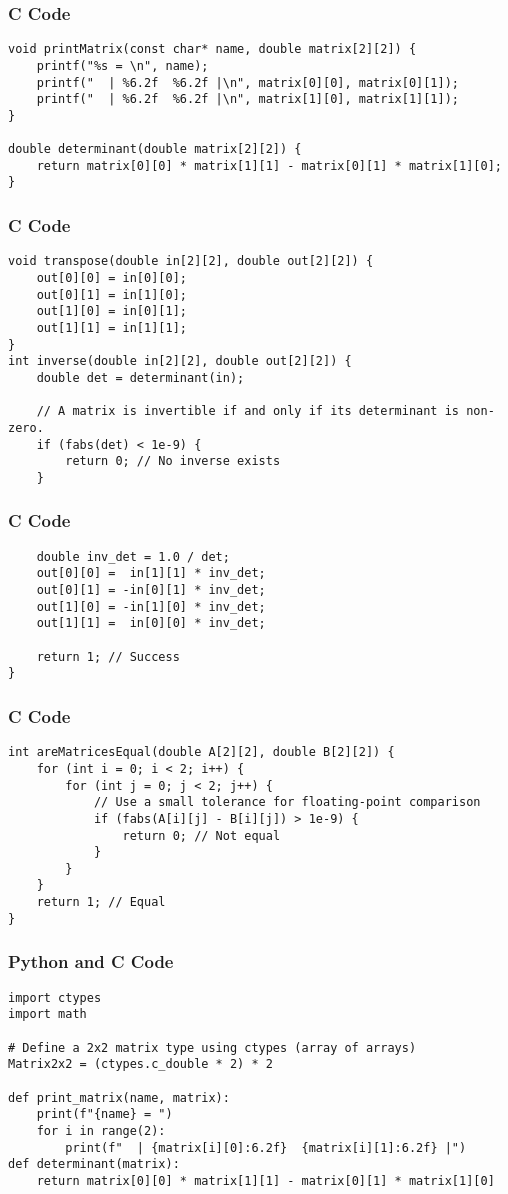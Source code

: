 \documentclass{beamer}
\begin{document}
\begin{frame}[fragile]
\frametitle{C Code}
\begin{lstlisting}
void printMatrix(const char* name, double matrix[2][2]) {
    printf("%s = \n", name);
    printf("  | %6.2f  %6.2f |\n", matrix[0][0], matrix[0][1]);
    printf("  | %6.2f  %6.2f |\n", matrix[1][0], matrix[1][1]);
}

double determinant(double matrix[2][2]) {
    return matrix[0][0] * matrix[1][1] - matrix[0][1] * matrix[1][0];
}
\end{lstlisting}
\end{frame}

\begin{frame}[fragile]
\frametitle{C Code}
\begin{lstlisting}
void transpose(double in[2][2], double out[2][2]) {
    out[0][0] = in[0][0];
    out[0][1] = in[1][0];
    out[1][0] = in[0][1];
    out[1][1] = in[1][1];
}
int inverse(double in[2][2], double out[2][2]) {
    double det = determinant(in);

    // A matrix is invertible if and only if its determinant is non-zero.
    if (fabs(det) < 1e-9) {
        return 0; // No inverse exists
    }
\end{lstlisting}
\end{frame}

\begin{frame}[fragile]
\frametitle{C Code}
\begin{lstlisting}
    double inv_det = 1.0 / det;
    out[0][0] =  in[1][1] * inv_det;
    out[0][1] = -in[0][1] * inv_det;
    out[1][0] = -in[1][0] * inv_det;
    out[1][1] =  in[0][0] * inv_det;

    return 1; // Success
}
\end{lstlisting}
\end{frame}

\begin{frame}[fragile]
\frametitle{C Code}
\begin{lstlisting}
int areMatricesEqual(double A[2][2], double B[2][2]) {
    for (int i = 0; i < 2; i++) {
        for (int j = 0; j < 2; j++) {
            // Use a small tolerance for floating-point comparison
            if (fabs(A[i][j] - B[i][j]) > 1e-9) {
                return 0; // Not equal
            }
        }
    }
    return 1; // Equal
}
\end{lstlisting}
\end{frame}

\begin{frame}[fragile]
\frametitle{Python and C Code}
\begin{lstlisting}
import ctypes
import math

# Define a 2x2 matrix type using ctypes (array of arrays)
Matrix2x2 = (ctypes.c_double * 2) * 2

def print_matrix(name, matrix):
    print(f"{name} = ")
    for i in range(2):
        print(f"  | {matrix[i][0]:6.2f}  {matrix[i][1]:6.2f} |")
def determinant(matrix):
    return matrix[0][0] * matrix[1][1] - matrix[0][1] * matrix[1][0]
\end{lstlisting}
\end{frame}
\end{document}
